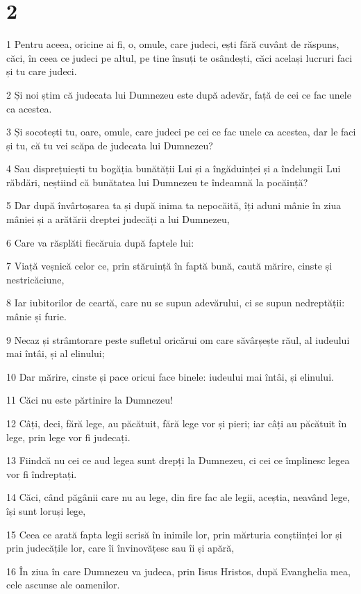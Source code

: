 \chapter{2}

\par 1 Pentru aceea, oricine ai fi, o, omule, care judeci, ești fără cuvânt de răspuns, căci, în ceea ce judeci pe altul, pe tine însuți te osândești, căci același lucruri faci și tu care judeci.
\par 2 Și noi știm că judecata lui Dumnezeu este după adevăr, față de cei ce fac unele ca acestea.
\par 3 Și socotești tu, oare, omule, care judeci pe cei ce fac unele ca acestea, dar le faci și tu, că tu vei scăpa de judecata lui Dumnezeu?
\par 4 Sau disprețuiești tu bogăția bunătății Lui și a îngăduinței și a îndelungii Lui răbdări, neștiind că bunătatea lui Dumnezeu te îndeamnă la pocăință?
\par 5 Dar după învârtoșarea ta și după inima ta nepocăită, îți aduni mânie în ziua mâniei și a arătării dreptei judecăți a lui Dumnezeu,
\par 6 Care va răsplăti fiecăruia după faptele lui:
\par 7 Viață veșnică celor ce, prin stăruință în faptă bună, caută mărire, cinste și nestricăciune,
\par 8 Iar iubitorilor de ceartă, care nu se supun adevărului, ci se supun nedreptății: mânie și furie.
\par 9 Necaz și strâmtorare peste sufletul oricărui om care săvârșește răul, al iudeului mai întâi, și al elinului;
\par 10 Dar mărire, cinste și pace oricui face binele: iudeului mai întâi, și elinului.
\par 11 Căci nu este părtinire la Dumnezeu!
\par 12 Câți, deci, fără lege, au păcătuit, fără lege vor și pieri; iar câți au păcătuit în lege, prin lege vor fi judecați.
\par 13 Fiindcă nu cei ce aud legea sunt drepți la Dumnezeu, ci cei ce împlinesc legea vor fi îndreptați.
\par 14 Căci, când păgânii care nu au lege, din fire fac ale legii, aceștia, neavând lege, își sunt loruși lege,
\par 15 Ceea ce arată fapta legii scrisă în inimile lor, prin mărturia conștiinței lor și prin judecățile lor, care îi învinovățesc sau îi și apără,
\par 16 În ziua în care Dumnezeu va judeca, prin Iisus Hristos, după Evanghelia mea, cele ascunse ale oamenilor.

